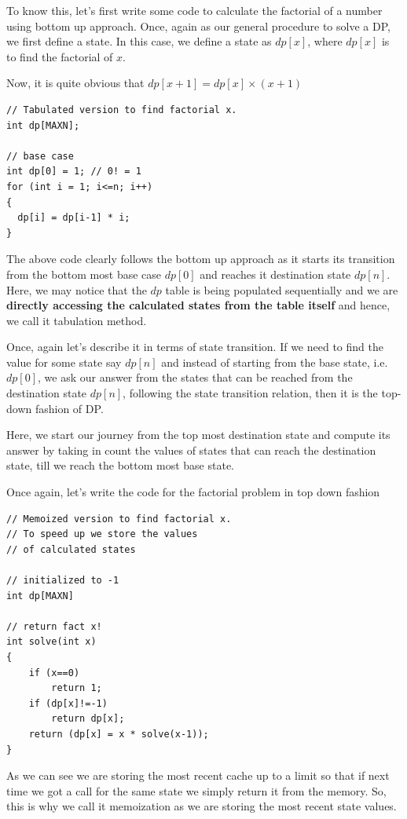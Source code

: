 
To know this, let's first write some code to calculate the factorial of a
number using bottom up approach. Once, again as our general procedure to
solve a DP, we first define a state. In this case, we define a state as
$dp[x]$, where $dp[x]$ is to find  the factorial of $x$.

Now, it is quite obvious that $dp[x+1] = dp[x]\times (x+1)$
\begin{lstlisting}[style=raycppnewsnippet]
// Tabulated version to find factorial x.
int dp[MAXN];

// base case
int dp[0] = 1; // 0! = 1
for (int i = 1; i<=n; i++)
{
  dp[i] = dp[i-1] * i;
}
\end{lstlisting}
The above code clearly follows the bottom up approach as it starts its
transition from the bottom most base case $dp[0]$ and reaches it destination
state $dp[n]$. Here, we may notice that the $dp$ table is being populated
sequentially and we are \textbf{directly accessing the calculated states
  from the table itself} and hence, we call it tabulation method.


Once, again let's describe it in terms of state transition. If we need to
find the value for some state say $dp[n]$ and instead of starting from the
base state, i.e. $dp[0]$, we ask our answer from the states that can be
reached from the destination state $dp[n]$, following the state transition
relation, then it is the top-down fashion of DP.

Here, we start our journey from the top most destination state and compute
its answer by taking in count the values of states that can reach the
destination state, till we reach the bottom most base state.

Once again, let's write the code for the factorial problem in top down
fashion
\begin{lstlisting}[style=raycppnewsnippet]
// Memoized version to find factorial x.
// To speed up we store the values
// of calculated states

// initialized to -1
int dp[MAXN]

// return fact x!
int solve(int x)
{
    if (x==0)
        return 1;
    if (dp[x]!=-1)
        return dp[x];
    return (dp[x] = x * solve(x-1));
}
\end{lstlisting}
As we can see we are storing the most recent cache up to a limit so that if
next time we got a call for the same state we simply return it from the
memory. So, this is why we call it memoization as we are storing the most
recent state values.

